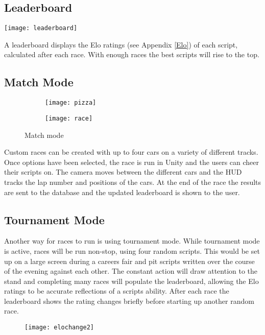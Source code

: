 \subsection{Leaderboard}
\centerline{\texttt{[image: leaderboard]}}
A leaderboard displays the Elo ratings (see Appendix \ref{Elo}) of each script, calculated after each race. With enough races the best scripts will rise to the top.

\subsection{Match Mode}

\begin{figure}[H]
\centering
\begin{subfigure}{.5\textwidth}
  \centering
\centerline{\texttt{[image: pizza]}}
  \label{fig:sub1}
\end{subfigure}%
\begin{subfigure}{.5\textwidth}
  \centering
\centerline{\texttt{[image: race]}}
  \label{fig:sub2}
\end{subfigure}
\label{fig:unityvsjava}
\caption{Match mode}
\end{figure}

Custom races can be created with up to four cars on a variety of different tracks. Once options have been selected, the race is run in Unity and the users can cheer their scripts on. The camera moves between the different cars and the HUD tracks the lap number and positions of the cars. At the end of the race the results are sent to the database and the updated leaderboard is shown to the user.

\subsection{Tournament Mode}
Another way for races to run is using tournament mode. While tournament mode is active, races will be run non-stop, using four random scripts. This would be set up on a large screen during a careers fair and pit scripts written over the course of the evening against each other. The constant action will draw attention to the stand and completing many races will populate the leaderboard, allowing the Elo ratings to be accurate reflections of a scripts ability. After each race the leaderboard shows the rating changes briefly before starting up another random race.
\begin{figure}[H]
\texttt{[image: elochange2]}
\end{figure}
